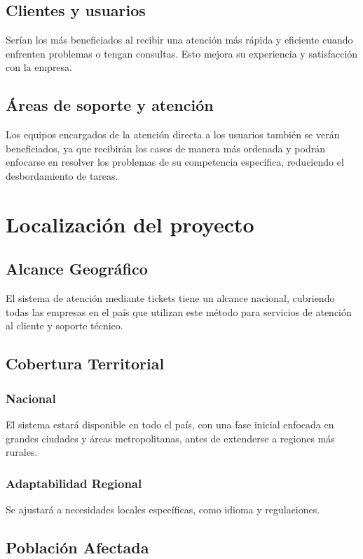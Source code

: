 \documentclass[a4paper,12pt]{article}
\begin{document}
\subsection{Clientes y usuarios}
Serían los más beneficiados al recibir una atención más rápida y eficiente cuando enfrenten problemas o tengan consultas. Esto mejora su experiencia y satisfacción con la empresa.

\subsection{Áreas de soporte y atención}
Los equipos encargados de la atención directa a los usuarios también se verán beneficiados, ya que recibirán los casos de manera más ordenada y podrán enfocarse en resolver los problemas de su competencia específica, reduciendo el desbordamiento de tareas.


\section{Localización del proyecto}
\subsection{Alcance Geográfico}
El sistema de atención mediante tickets tiene un alcance nacional, cubriendo todas las empresas en el país que utilizan este método para servicios de atención al cliente y soporte técnico.

\subsection{Cobertura Territorial}
\subsubsection{Nacional}
El sistema estará disponible en todo el país, con una fase inicial enfocada en grandes ciudades y áreas metropolitanas, antes de extenderse a regiones más rurales.

\subsubsection{Adaptabilidad Regional}
Se ajustará a necesidades locales específicas, como idioma y regulaciones.


\subsection{Población Afectada}
\end{document}
